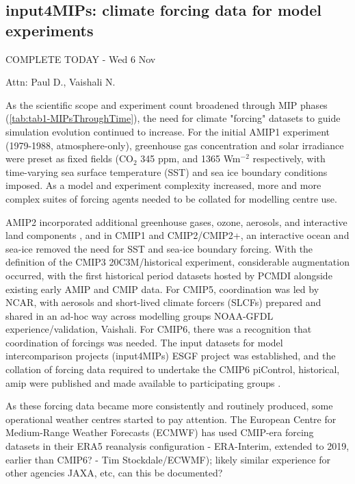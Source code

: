 \documentclass[gmd, preprint]{copernicus}
\def\cred#1{{\color{red}#1}}
\def\cblue#1{{\color{blue}#1}}
\begin{document}
\subsection{input4MIPs: climate forcing data for model experiments}
\label{sec:input4MIPs}
\cblue{COMPLETE TODAY - Wed 6 Nov}

\cred{Attn: Paul D., Vaishali N.}

As the scientific scope and experiment count broadened through MIP phases (\autoref{tab:tab1-MIPsThroughTime}), the need for climate "forcing" datasets to guide simulation evolution continued to increase. For the initial AMIP1  experiment (1979-1988, atmosphere-only), greenhouse gas concentration and solar irradiance were preset as fixed fields (CO$_{2}$ 345 ppm, and 1365 Wm$^{-2}$ respectively, with time-varying sea surface temperature (SST) and sea ice boundary conditions imposed. As a model and experiment complexity increased, more and more complex suites of forcing agents needed to be collated for modelling centre use.

AMIP2 incorporated additional greenhouse gases, ozone, aerosols, and interactive land components \citep{gleckler_amip_1996-1,liang_pcmdi_1997}, and in CMIP1 and CMIP2/CMIP2+, an interactive ocean and sea-ice removed the need for SST and sea-ice boundary forcing. With the definition of the CMIP3 20C3M/historical experiment, considerable augmentation occurred, with the first historical period datasets hosted by PCMDI alongside existing early AMIP and CMIP data. For CMIP5, coordination was led by NCAR, with aerosols and short-lived climate forcers (SLCFs) prepared and shared in an ad-hoc way across modelling groups \cred{NOAA-GFDL experience/validation, Vaishali}. For CMIP6, there was a recognition that coordination of forcings was needed. The input datasets for model intercomparison projects (input4MIPs) ESGF project was established, and the collation of forcing data required to undertake the CMIP6 piControl, historical, amip were published and made available to participating groups \citep{durack_toward_2018}.

\cred{As these forcing data became more consistently and routinely produced, some operational weather centres started to pay attention. The European Centre for Medium-Range Weather Forecasts (ECMWF) has used CMIP-era forcing datasets in their ERA5 reanalysis configuration - ERA-Interim, extended to 2019, earlier than CMIP6? - Tim Stockdale/ECWMF); likely similar experience for other agencies JAXA, etc, can this be documented?}
\end{document}
